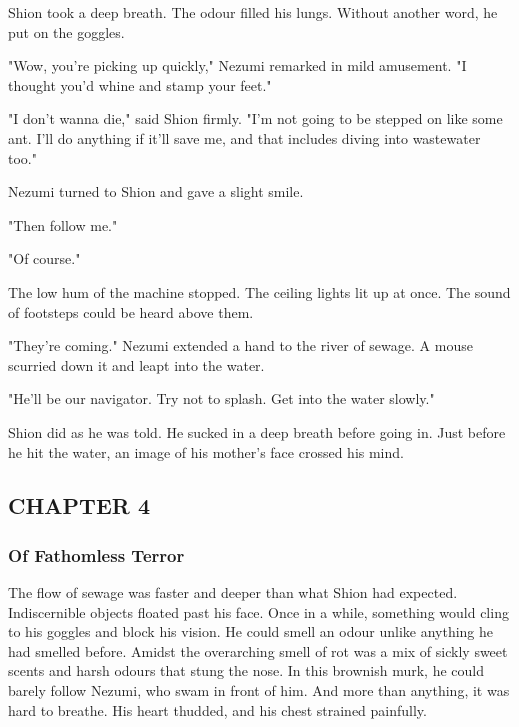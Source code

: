 Shion took a deep breath. The odour filled his lungs. Without another
word, he put on the goggles.

"Wow, you're picking up quickly," Nezumi remarked in mild amusement. "I
thought you'd whine and stamp your feet."

"I don't wanna die," said Shion firmly. "I'm not going to be stepped on
like some ant. I'll do anything if it'll save me, and that includes
diving into wastewater too."

Nezumi turned to Shion and gave a slight smile.

"Then follow me."

"Of course."

The low hum of the machine stopped. The ceiling lights lit up at once.
The sound of footsteps could be heard above them.

"They're coming." Nezumi extended a hand to the river of sewage. A mouse
scurried down it and leapt into the water.

"He'll be our navigator. Try not to splash. Get into the water slowly."

Shion did as he was told. He sucked in a deep breath before going in.
Just before he hit the water, an image of his mother's face crossed his
mind.

\hypertarget{index_split_051.htmlux5cux23calibre_pb_85}{}

\protect\hypertarget{index_split_083.html}{}{}

\hypertarget{index_split_083.htmlux5cux23calibre_pb_0}{}

\hypertarget{index_split_083.htmlux5cux23calibre_toc_5}{%
\subsection{CHAPTER 4}\label{index_split_083.htmlux5cux23calibre_toc_5}}

\subsubsection{Of Fathomless Terror}

The flow of sewage was faster and deeper than what Shion had expected.
Indiscernible objects floated past his face. Once in a while, something
would cling to his goggles and block his vision. He could smell an odour
unlike anything he had smelled before. Amidst the overarching smell of
rot was a mix of sickly sweet scents and harsh odours that stung the
nose. In this brownish murk, he could barely follow Nezumi, who swam in
front of him. And more than anything, it was hard to breathe. His heart
thudded, and his chest strained painfully.

